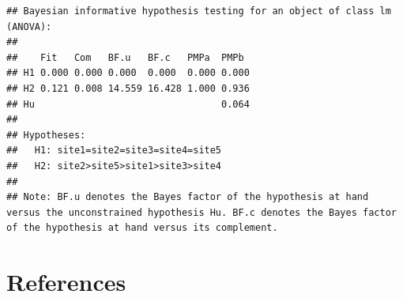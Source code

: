 \documentclass[
]{book}
\begin{document}
\begin{verbatim}
## Bayesian informative hypothesis testing for an object of class lm (ANOVA):
## 
##    Fit   Com   BF.u   BF.c   PMPa  PMPb 
## H1 0.000 0.000 0.000  0.000  0.000 0.000
## H2 0.121 0.008 14.559 16.428 1.000 0.936
## Hu                                 0.064
## 
## Hypotheses:
##   H1: site1=site2=site3=site4=site5
##   H2: site2>site5>site1>site3>site4
## 
## Note: BF.u denotes the Bayes factor of the hypothesis at hand versus the unconstrained hypothesis Hu. BF.c denotes the Bayes factor of the hypothesis at hand versus its complement.
\end{verbatim}

\hypertarget{references}{%
\chapter*{References}\label{references}}
\end{document}
